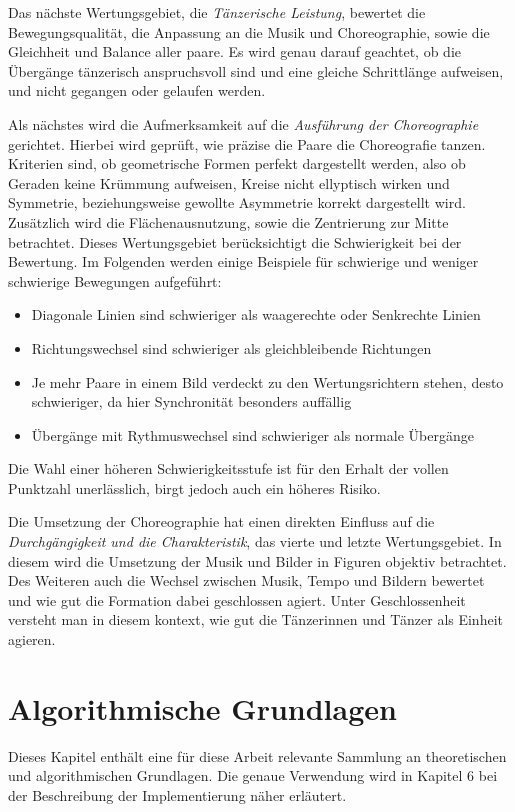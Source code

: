 \documentclass[
  ngerman,
  a4paper,  %
  twoside,  %
  bibliography=totoc,
  headsepline,
  cleardoublepage=empty,
  parskip=half,
  draft=false
]{scrbook}
\begin{document}
Das nächste Wertungsgebiet, die \textit{Tänzerische Leistung}, bewertet die Bewegungsqualität, die Anpassung an die Musik und Choreographie, sowie die Gleichheit und Balance aller paare.
Es wird genau darauf geachtet, ob die Übergänge tänzerisch anspruchsvoll sind und eine gleiche Schrittlänge aufweisen, und nicht gegangen oder gelaufen werden.

Als nächstes wird die Aufmerksamkeit auf die \textit{Ausführung der Choreographie} gerichtet.
Hierbei wird geprüft, wie präzise die Paare die Choreografie tanzen.
Kriterien sind, ob geometrische Formen perfekt dargestellt werden, also ob Geraden keine Krümmung aufweisen, Kreise nicht ellyptisch wirken und Symmetrie, beziehungsweise gewollte Asymmetrie korrekt dargestellt wird. Zusätzlich wird die Flächenausnutzung, sowie die Zentrierung zur Mitte betrachtet. Dieses Wertungsgebiet berücksichtigt die Schwierigkeit bei der Bewertung. Im Folgenden werden einige Beispiele für schwierige und weniger schwierige Bewegungen aufgeführt:
\begin{itemize}
  \item Diagonale Linien sind schwieriger als waagerechte oder Senkrechte Linien
  \item Richtungswechsel sind schwieriger als gleichbleibende Richtungen
  \item Je mehr Paare in einem Bild verdeckt zu den Wertungsrichtern stehen, desto schwieriger, da hier Synchronität besonders auffällig
  \item Übergänge mit Rythmuswechsel sind schwieriger als normale Übergänge
\end{itemize}
Die Wahl einer höheren Schwierigkeitsstufe ist für den Erhalt der vollen Punktzahl unerlässlich, birgt jedoch auch ein höheres Risiko.

Die Umsetzung der Choreographie hat einen direkten Einfluss auf die \textit{Durchgängigkeit und die Charakteristik}, das vierte und letzte Wertungsgebiet.
In diesem wird die Umsetzung der Musik und Bilder in Figuren objektiv betrachtet.
Des Weiteren auch die Wechsel zwischen Musik, Tempo und Bildern bewertet und wie gut die Formation dabei geschlossen agiert.
Unter Geschlossenheit versteht man in diesem kontext, wie gut die Tänzerinnen und Tänzer als Einheit agieren.

\section{Algorithmische Grundlagen}
Dieses Kapitel enthält eine für diese Arbeit relevante Sammlung an theoretischen und algorithmischen Grundlagen. Die genaue Verwendung wird in Kapitel 6 bei der Beschreibung der Implementierung näher erläutert.
\end{document}
